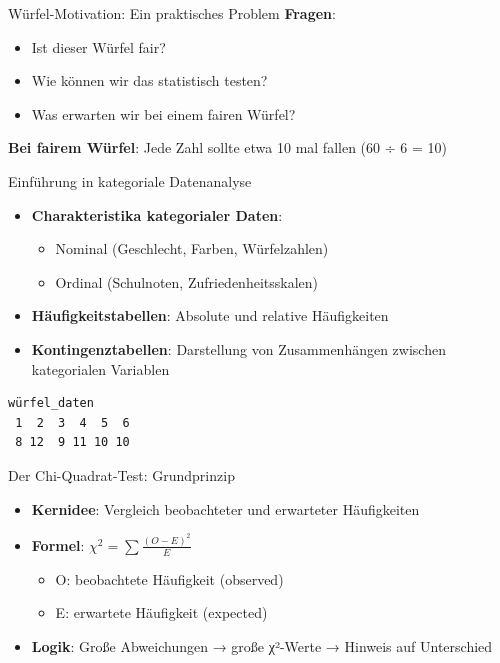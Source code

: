 \documentclass[
  ignorenonframetext,
]{beamer}
\providecommand{\tightlist}{%
  \setlength{\itemsep}{0pt}\setlength{\parskip}{0pt}}
\begin{document}
\begin{frame}{Würfel-Motivation: Ein praktisches Problem}
\protect{}\label{wuxfcrfel-motivation-ein-praktisches-problem-1}
\textbf{Fragen}:

\begin{itemize}
\item
  Ist dieser Würfel fair?
\item
  Wie können wir das statistisch testen?
\item
  Was erwarten wir bei einem fairen Würfel?
\end{itemize}

\textbf{Bei fairem Würfel}: Jede Zahl sollte etwa 10 mal fallen (60 ÷ 6
= 10)
\end{frame}

\begin{frame}[fragile]{Einführung in kategoriale Datenanalyse}
\protect{}\label{einfuxfchrung-in-kategoriale-datenanalyse}
\begin{itemize}
\tightlist
\item
  \textbf{Charakteristika kategorialer Daten}:

  \begin{itemize}
  \tightlist
  \item
    Nominal (Geschlecht, Farben, Würfelzahlen)
  \item
    Ordinal (Schulnoten, Zufriedenheitsskalen)
  \end{itemize}
\item
  \textbf{Häufigkeitstabellen}: Absolute und relative Häufigkeiten
\item
  \textbf{Kontingenztabellen}: Darstellung von Zusammenhängen zwischen
  kategorialen Variablen
\end{itemize}

\begin{verbatim}
würfel_daten
 1  2  3  4  5  6 
 8 12  9 11 10 10 
\end{verbatim}
\end{frame}

\begin{frame}{Der Chi-Quadrat-Test: Grundprinzip}
\protect{}\label{der-chi-quadrat-test-grundprinzip}
\begin{itemize}
\tightlist
\item
  \textbf{Kernidee}: Vergleich beobachteter und erwarteter Häufigkeiten
\item
  \textbf{Formel}: \(\chi^2 = \sum \frac{(O - E)^2}{E}\)

  \begin{itemize}
  \tightlist
  \item
    O: beobachtete Häufigkeit (observed)
  \item
    E: erwartete Häufigkeit (expected)
  \end{itemize}
\item
  \textbf{Logik}: Große Abweichungen → große χ²-Werte → Hinweis auf
  Unterschied
\end{itemize}
\end{frame}
\end{document}
